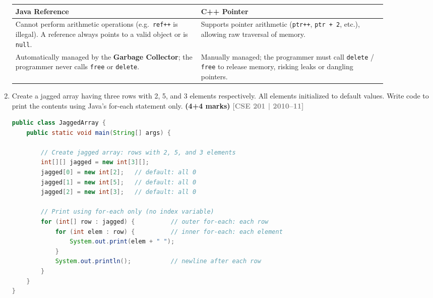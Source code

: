 \documentclass[12pt,a3paper]{article}
\newcommand{\yr}[1]{\hfill\textcolor{gray}{\small\textbf{[#1]}}}
\newcommand{\mk}[1]{\textcolor{orange!70!black}{\small\textbf{(#1 marks)}}}
\begin{document}
\begin{enumerate}
\begin{tcolorbox}[enhanced,breakable,ansbox,
  colback=cB!4,colframe=cB,boxrule=0.8pt,arc=5pt,
  title={\textbf{Answer --- Java Reference vs.\ C++ Pointer}},
  fonttitle=\bfseries\color{white},colbacktitle=cB]
\begin{center}
\small
\begin{tabular}{@{}p{0.44\linewidth}p{0.44\linewidth}@{}}
\toprule
\textbf{Java Reference} & \textbf{C++ Pointer} \\
\midrule
Cannot perform arithmetic operations (e.g.\ \texttt{ref++} is
illegal). A reference always points to a valid object or is
\texttt{null}. &
Supports pointer arithmetic (\texttt{ptr++}, \texttt{ptr + 2}, etc.),
allowing raw traversal of memory. \\[6pt]
Automatically managed by the \textbf{Garbage Collector}; the
programmer never calls \texttt{free} or \texttt{delete}. &
Manually managed; the programmer must call \texttt{delete} /
\texttt{free} to release memory, risking leaks or dangling pointers. \\
\bottomrule
\end{tabular}
\end{center}

\end{tcolorbox}

\item Create a jagged array having three rows with 2, 5, and 3 elements respectively. All elements initialized to default values. Write code to print the contents using Java's for-each statement only. \mk{4+4}
\yr{CSE 201 | 2010--11}

\begin{tcolorbox}[enhanced,breakable,ansbox,
  colback=cB!4,colframe=cB,boxrule=0.8pt,arc=5pt,
  title={\textbf{Answer --- Jagged Array: Creation \& For-Each Print}},
  fonttitle=\bfseries\color{white},colbacktitle=cB]

\begin{lstlisting}[language=Java]
public class JaggedArray {
    public static void main(String[] args) {

        // Create jagged array: rows with 2, 5, and 3 elements
        int[][] jagged = new int[3][];
        jagged[0] = new int[2];   // default: all 0
        jagged[1] = new int[5];   // default: all 0
        jagged[2] = new int[3];   // default: all 0

        // Print using for-each only (no index variable)
        for (int[] row : jagged) {          // outer for-each: each row
            for (int elem : row) {          // inner for-each: each element
                System.out.print(elem + " ");
            }
            System.out.println();           // newline after each row
        }
    }
}
\end{lstlisting}


\end{tcolorbox}
\end{enumerate}
\end{document}
